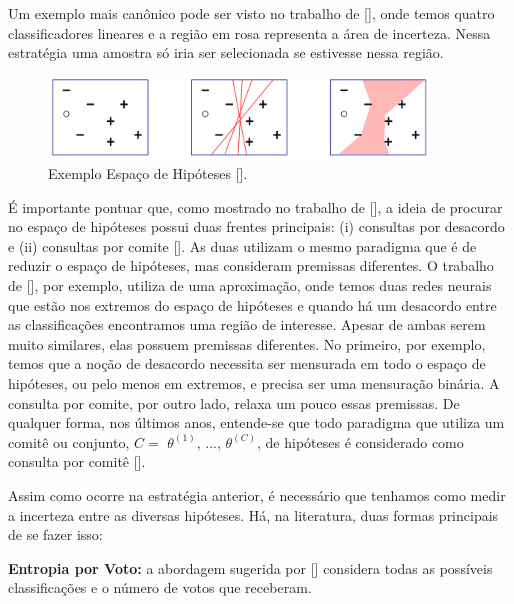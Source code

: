 Um exemplo mais canônico pode ser visto no trabalho de [\cite{dasgupta2011two}], onde temos quatro classificadores lineares e a região em rosa representa a área de incerteza. Nessa estratégia uma amostra só iria ser selecionada se estivesse nessa região.

\begin{figure}
  \centering
  \includegraphics[width=0.9\textwidth]{figures/dasgupta_two_faces_hypothesis_example.png}
  \caption{Exemplo Espaço de Hipóteses [\cite{dasgupta2011two}].}
  \label{fig:dasgupta_two_faces_hypothesis_example}
\end{figure}

É importante pontuar que, como mostrado no trabalho de [\cite{settles2014active}], a ideia de procurar no espaço de hipóteses possui duas frentes principais: (i) consultas por desacordo e (ii) consultas por comite [\cite{seung1992query}]. As duas utilizam o mesmo paradigma que é de reduzir o espaço de hipóteses, mas consideram premissas diferentes. O trabalho de [\cite{cohn1994improving}], por exemplo, utiliza de uma aproximação, onde temos duas redes neurais que estão nos extremos do espaço de hipóteses e quando há um desacordo entre as classificações encontramos uma região de interesse. Apesar de ambas serem muito similares, elas possuem premissas diferentes. No primeiro, por exemplo, temos que a noção de desacordo necessita ser mensurada em todo o espaço de hipóteses, ou pelo menos em extremos, e precisa ser uma mensuração binária. A consulta por comite, por outro lado, relaxa um pouco essas premissas. De qualquer forma, nos últimos anos, entende-se que todo paradigma que utiliza um comitê ou conjunto, $C =$ { $\theta^{(1)}$, ..., $\theta^{(C)}$}, de hipóteses é considerado como consulta por comitê [\cite{settles2012active, settles2014active}].


Assim como ocorre na estratégia anterior, é necessário que tenhamos como medir a incerteza entre as diversas hipóteses. Há, na literatura, duas formas principais de se fazer isso: 

\textbf{Entropia por Voto:} a abordagem sugerida por [\cite{dagan1995committee}] considera todas as possíveis classificações e o número de votos que receberam. 

